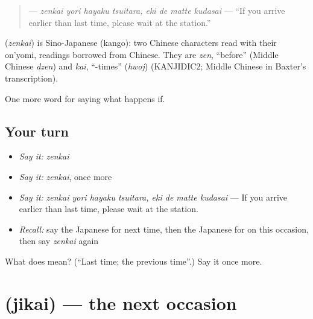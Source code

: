 \begin{quote}
\textbf{    } — \emph{zenkai yori hayaku tsuitara, eki de matte kudasai} — \textquotedblleft{}If you arrive earlier than last time, please wait at the station.\textquotedblright{}
\end{quote}

\begin{cousinweb}
\textbf{} (\emph{zenkai}) is Sino-Japanese (kango): two Chinese characters read with their on'yomi, readings borrowed from Chinese. They are \emph{zen}, \textquotedblleft{}before\textquotedblright{} (Middle Chinese \emph{dzen}) and \emph{kai}, \textquotedblleft{}-times\textquotedblright{} (\emph{hwoj}) (KANJIDIC2; Middle Chinese in Baxter's transcription).
\end{cousinweb}

\begin{grammarlens}[title={What you've built}]
One more word for saying what happens if.
\end{grammarlens}

\subsection*{Your turn}
\begin{itemize}
\raggedright
  \item \emph{Say it:} \emph{zenkai}
  \item \emph{Say it:} \emph{zenkai}, once more
  \item \emph{Say it:} \emph{zenkai yori hayaku tsuitara, eki de matte kudasai} — If you arrive earlier than last time, please wait at the station.
  \item \emph{Recall:} say the Japanese for next time, then the Japanese for on this occasion, then say \emph{zenkai} again
\end{itemize}

\begin{tcolorbox}[breakable,colback=teal!4,colframe=teal!35!black,title={Before you move on}]
What does  mean? (\textquotedblleft{}Last time; the previous time\textquotedblright{}.) Say it once more.
\end{tcolorbox}
\section[\texorpdfstring{\ja{じかい} (jikai)}{じかい (jikai)}]{ (jikai) — the next occasion}

